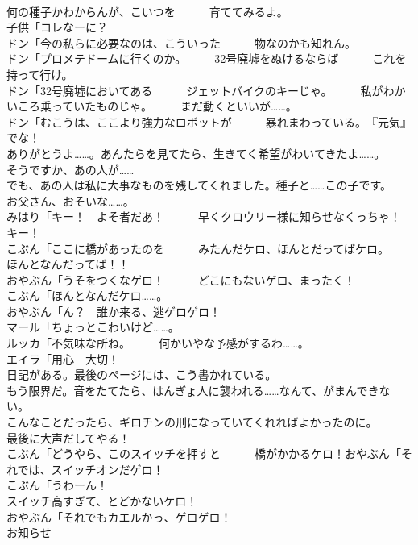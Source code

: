 \documentclass[8pt]{extreport}
\begin{document}
\begin{CJK}{UTF8}{min}
\\	何の種子かわからんが、こいつを　　　育ててみるよ。	
\\	子供「コレなーに？	
\\	ドン「今の私らに必要なのは、こういった　　　物なのかも知れん。	
\\	ドン「プロメテドームに行くのか。　　　32号廃墟をぬけるならば　　　これを持って行け。	
\\	ドン「32号廃墟においてある　　　ジェットバイクのキーじゃ。　　　私がわかいころ乗っていたものじゃ。　　　まだ動くといいが……。	
\\	ドン「むこうは、ここより強力なロボットが　　　暴れまわっている。　『元気』でな！	
\\	ありがとうよ……。あんたらを見てたら、生きてく希望がわいてきたよ……。	
\\	そうですか、あの人が……	
\\	でも、あの人は私に大事なものを残してくれました。種子と……この子です。	
\\	お父さん、おそいな……。	
\\	みはり「キー！　よそ者だあ！　　　早くクロウリー様に知らせなくっちゃ！　　　キー！	
\\	こぶん「ここに橋があったのを　　　みたんだケロ、ほんとだってばケロ。　　　ほんとなんだってば！！	
\\	おやぶん「うそをつくなゲロ！　　　どこにもないゲロ、まったく！	
\\	こぶん「ほんとなんだケロ……。	
\\	おやぶん「ん？　誰か来る、逃ゲロゲロ！	
\\	マール「ちょっとこわいけど……。	
\\	ルッカ「不気味な所ね。　　　何かいやな予感がするわ……。	
\\	エイラ「用心　大切！	
\\	日記がある。最後のページには、こう書かれている。	
\\	もう限界だ。音をたてたら、はんぎょ人に襲われる……なんて、がまんできない。	
\\	こんなことだったら、ギロチンの刑になっていてくれればよかったのに。	
\\	最後に大声だしてやる！	
\\	こぶん「どうやら、このスイッチを押すと　　　橋がかかるケロ！おやぶん「それでは、スイッチオンだゲロ！	
\\	こぶん「うわーん！	
\\	スイッチ高すぎて、とどかないケロ！	
\\	おやぶん「それでもカエルかっ、ゲロゲロ！	
\\	お知らせ	

\end{CJK}
\end{document}
